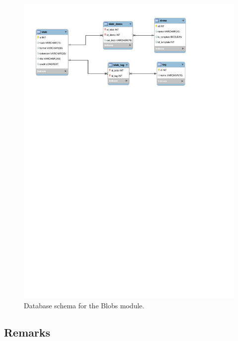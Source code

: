 \begin{figure}[H]
  \centering
  \includegraphics[width=5in]{blobs/images/images_bdd}
  \caption{Database schema for the Blobs module. }
  \label{img:images_bdd}
\end{figure}

\subsection{Remarks}
